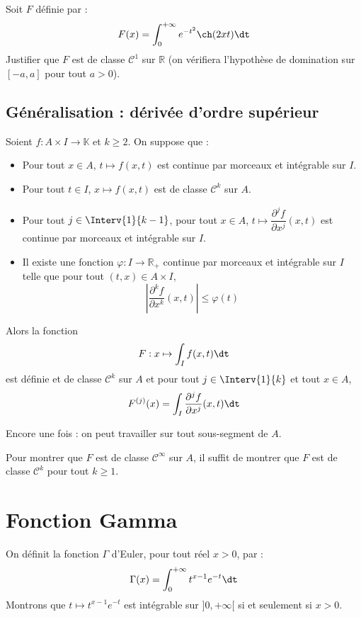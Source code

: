\documentclass[a4paper,10pt]{report}
\begin{document}
\newpage

\begin{exa} Soit $F$ définie par :
$$ F(x) = \int_{0}^{+ \infty} e^{-t^2} \ch(2xt) \dt$$
Justifier que $F$ est de classe $\mathcal{C}^1$ sur $\mathbb{R}$ (on vérifiera l'hypothèse de domination sur $[-a,a]$ pour tout $a>0$).
\end{exa}

\subsection{Généralisation : dérivée d'ordre supérieur}
\begin{thm}
Soient $f : A \times I \rightarrow \mathbb{K}$ et $k \geq 2$. On suppose que :
\begin{itemize}
\item Pour tout $x \in A$, $t \mapsto f(x,t)$ est continue par morceaux et intégrable sur $I$.
\item Pour tout $t \in I$, $x \mapsto f(x,t)$ est de classe $\mathcal{C}^k$ sur $A$.
\item Pour tout $j \in \Interv{1}{k-1}$, pour tout $x \in A$, $t \mapsto \dfrac{\partial^j f}{\partial x^j}(x,t)$ est continue par morceaux et intégrable sur $I$.
\item Il existe une fonction $\varphi : I \rightarrow \mathbb{R}_+$ continue par morceaux et intégrable sur $I$ telle que pour tout $(t,x) \in A \times I$,
$$ \left\vert \dfrac{\partial^k f}{\partial x^k}(x,t) \right\vert \leq \varphi(t)$$
\end{itemize}
Alors la fonction 
$$ F : x \mapsto \int_{I} f(x,t) \dt$$
est définie et de classe $\mathcal{C}^k$ sur $A$ et pour tout $j \in \Interv{1}{k}$ et tout $x \in A$,
$$ F^{(j)}(x) = \int_{I}  \dfrac{\partial^{j} f}{\partial x^j}(x,t) \dt$$
\end{thm}

\begin{rems}
\item Encore une fois : on peut travailler sur tout sous-segment de $A$.
\item Pour montrer que $F$ est de classe $\mathcal{C}^{\infty}$ sur $A$, il suffit de montrer que $F$ est de classe $\mathcal{C}^k$ pour tout $k \geq 1$.
\end{rems}
\section{Fonction Gamma}
\noindent On définit la fonction $\Gamma$ d'Euler, pour tout réel $x>0$, par :
$$ \Gamma(x) = \int_{0}^{+ \infty} t^{x-1} e^{-t} \dt$$
Montrons que $t \mapsto  t^{x-1} e^{-t}$ est intégrable sur $]0, + \infty[$ si et seulement si $x>0$.
\end{document}
